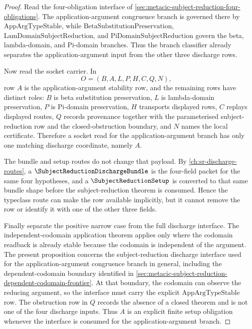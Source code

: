 \begin{proof}
Read the four-obligation interface of \autoref{sec:metacic-subject-reduction-four-obligations}. The application-argument congruence branch is governed there by $\mathrm{AppArgTypeStable}$, while $\mathrm{BetaSubstitutionPreservation}$, $\mathrm{LamDomainSubjectReduction}$, and $\mathrm{PiDomainSubjectReduction}$ govern the beta, lambda-domain, and Pi-domain branches. Thus the branch classifier already separates the application-argument input from the other three discharge rows.

Now read the socket carrier. In
$$
O=(B,A,L,P,H,C,Q,N),
$$
row $A$ is the application-argument stability row, and the remaining rows have distinct roles: $B$ is beta substitution preservation, $L$ is lambda-domain preservation, $P$ is Pi-domain preservation, $H$ transports displayed rows, $C$ replays displayed routes, $Q$ records provenance together with the parameterised subject-reduction row and the closed-obstruction boundary, and $N$ names the local certificate. Therefore a socket read for the application-argument branch has only one matching discharge coordinate, namely $A$.

The bundle and setup routes do not change that payload. By \autoref{ch:sr-discharge-routes}, a $\SubjectReductionDischargeBundle$ is the four-field packet for the same four hypotheses, and a $\SubjectReductionSetup$ is converted to that same bundle shape before the subject-reduction theorem is consumed. Hence the typeclass route can make the row available implicitly, but it cannot remove the row or identify it with one of the other three fields.

Finally separate the positive narrow case from the full discharge interface. The independent-codomain application theorem applies only where the codomain readback is already stable because the codomain is independent of the argument. The present proposition concerns the subject-reduction discharge interface used for the application-argument congruence branch in general, including the dependent-codomain boundary identified in \autoref{sec:metacic-subject-reduction-dependent-codomain-frontier}. At that boundary, the codomain can observe the reducing argument, so the interface must carry the explicit $\mathrm{AppArgTypeStable}$ row. The obstruction row in $Q$ records the absence of a closed theorem and is not one of the four discharge inputs. Thus $A$ is an explicit finite setup obligation whenever the interface is consumed for the application-argument branch.
\end{proof}


